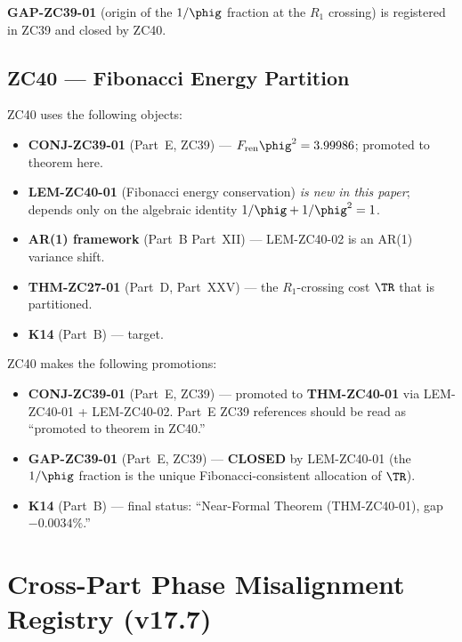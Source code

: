 \documentclass[12pt, a4paper]{article}
\begin{document}
\noindent \textbf{GAP-ZC39-01} (origin of the $1/\phig$ fraction at the
$R_1$ crossing) is registered in ZC39 and closed by ZC40.

\bigskip

\subsection{ZC40 --- Fibonacci Energy Partition}
\label{cmap:zc40}

\begin{inheritbox}
ZC40 uses the following objects:
\begin{itemize}[noitemsep,leftmargin=1.5em]
  \item \textbf{CONJ-ZC39-01} (Part~E, ZC39) ---
    $F_{\rm ren}\phig^2 = 3.99986$; promoted to theorem here.
  \item \textbf{LEM-ZC40-01} (Fibonacci energy conservation)
    \emph{is new in this paper}; depends only on the algebraic
    identity $1/\phig + 1/\phig^2 = 1$.
  \item \textbf{AR(1) framework} (Part~B Part~XII) --- LEM-ZC40-02
    is an AR(1) variance shift.
  \item \textbf{THM-ZC27-01} (Part~D, Part~XXV) --- the $R_1$-crossing
    cost $\TR$ that is partitioned.
  \item \textbf{K14} (Part~B) --- target.
\end{itemize}
\end{inheritbox}

\begin{correctionbox}
ZC40 makes the following promotions:
\begin{itemize}[noitemsep,leftmargin=1.5em]
  \item \textbf{CONJ-ZC39-01} (Part~E, ZC39) ---
    promoted to \textbf{THM-ZC40-01} via LEM-ZC40-01 + LEM-ZC40-02.
    Part~E ZC39 references should be read as ``promoted to theorem
    in ZC40.''
  \item \textbf{GAP-ZC39-01} (Part~E, ZC39) --- \textbf{CLOSED}
    by LEM-ZC40-01 (the $1/\phig$ fraction is the unique
    Fibonacci-consistent allocation of $\TR$).
  \item \textbf{K14} (Part~B) --- final status:
    ``Near-Formal Theorem (THM-ZC40-01), gap $-0.0034\%$.''
\end{itemize}
\end{correctionbox}

\bigskip

\section{Cross-Part Phase Misalignment Registry (v17.7)}
\end{document}
